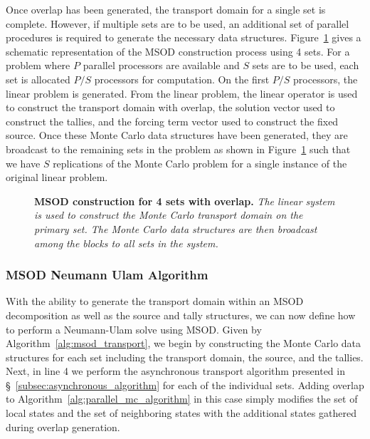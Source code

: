 \documentclass[letterpaper,11pt]{article}
\begin{document}
Once overlap has been generated, the transport domain for a single set
is complete. However, if multiple sets are to be used, an additional
set of parallel procedures is required to generate the necessary data
structures. Figure~\ref{fig:msod_construction} gives a schematic
representation of the MSOD construction process using 4 sets. For a
problem where $P$ parallel processors are available and $S$ sets are
to be used, each set is allocated $P/S$ processors for computation. On
the first $P/S$ processors, the linear problem is generated. From the
linear problem, the linear operator is used to construct the transport
domain with overlap, the solution vector used to construct the
tallies, and the forcing term vector used to construct the fixed
source. Once these Monte Carlo data structures have been generated,
they are broadcast to the remaining sets in the problem as shown in
Figure~\ref{fig:msod_construction} such that we have $S$ replications
of the Monte Carlo problem for a single instance of the original
linear problem.

\clearpage

\begin{figure}[t!]
  \begin{center}
    \scalebox{0.55}{  }
  \end{center}
  \caption{\textbf{MSOD construction for 4 sets with overlap.}
    \textit{The linear system is used to construct the Monte Carlo
      transport domain on the primary set. The Monte Carlo data
      structures are then broadcast among the blocks to all sets in
      the system.}}
  \label{fig:msod_construction}
\end{figure}

\subsubsection{MSOD Neumann Ulam Algorithm}
\label{subsubsec:msod_algorithm}

With the ability to generate the transport domain within an MSOD
decomposition as well as the source and tally structures, we can now
define how to perform a Neumann-Ulam solve using MSOD. Given by
Algorithm~\ref{alg:msod_transport}, we begin by constructing the Monte
Carlo data structures for each set including the transport domain, the
source, and the tallies. Next, in line 4 we perform the asynchronous
transport algorithm presented in \S~\ref{subsec:asynchronous_algorithm}
for each of the individual sets. Adding overlap to
Algorithm~\ref{alg:parallel_mc_algorithm} in this case simply modifies
the set of local states and the set of neighboring states with the
additional states gathered during overlap generation.
\end{document}
